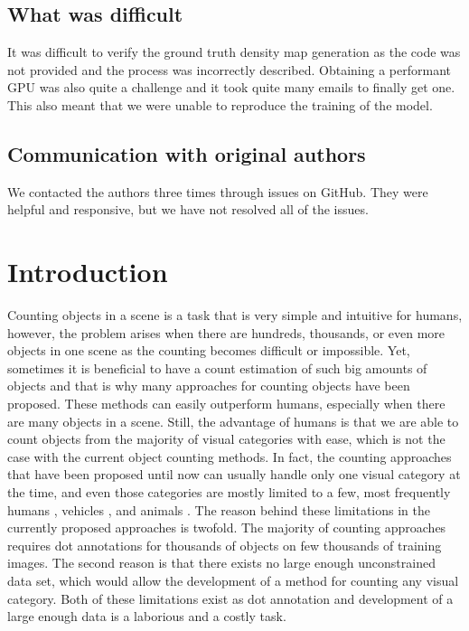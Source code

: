 \subsection*{What was difficult}

It was difficult to verify the ground truth density map generation as the code was not provided and the process was incorrectly described. Obtaining a performant GPU was also quite a challenge and it took quite many emails to finally get one. This also meant that we were unable to reproduce the training of the model.

\subsection*{Communication with original authors}

We contacted the authors three times through issues on GitHub. They were helpful and responsive, but we have not resolved all of the issues.
\newpage

\section{Introduction}

Counting objects in a scene is a task that is very simple and intuitive for humans, however, the problem arises when there are hundreds, thousands, or even more objects in one scene as the counting becomes difficult or impossible. Yet, sometimes it is beneficial to have a count estimation of such big amounts of objects and that is why many approaches for counting objects have been proposed. These methods can easily outperform humans, especially when there are many objects in a scene. Still, the advantage of humans is that we are able to count objects from the majority of visual categories with ease, which is not the case with the current object counting methods. In fact, the counting approaches that have been proposed until now can usually handle only one visual category at the time, and even those categories are mostly limited to a few, most frequently humans \cite{abousamra2021localization, boominathan2016crowdnet, cao2018scale, ranjan2020uncertainty,zhang2015cross}, vehicles \cite{asha2018vehicle, chen2021multi, onoro2016towards, quesada2016automatic, zhang2017fcn}, and animals \cite{arteta2016counting, zhang2020automatic}.
The reason behind these limitations in the currently proposed approaches is twofold. The majority of counting approaches requires dot annotations for thousands of objects on few thousands of training images. The second reason is that there exists no large enough unconstrained data set, which would allow the development of a method for counting any visual category. Both of these limitations exist as dot annotation and development of a large enough data is a laborious and a costly task.

